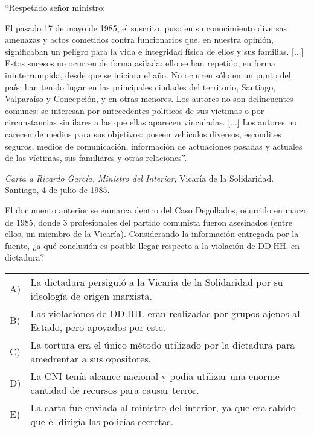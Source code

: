 \documentclass[letterpaper,11pt]{article}
\newcommand{\anchopregunta}{0.9\textwidth}
\begin{document}
\begin{enumerate}
\begin{minipage}{\anchopregunta}
\item \begin{flushleft}
    ``Respetado señor ministro:
\end{flushleft}
El pasado 17 de mayo de 1985, el suscrito, puso en su conocimiento diversas amenazas y actos cometidos contra funcionarios que, en nuestra opinión, significaban un peligro para la vida e integridad física de ellos y sus familias. [...] Estos sucesos no ocurren de forma asilada: ello se han repetido, en forma ininterrumpida, desde que se iniciara el año. No ocurren sólo en un punto del país: han tenido lugar en las principales ciudades del territorio, Santiago, Valparaíso y Concepción, y en otras menores. Los autores no son delincuentes comunes: se interesan por antecedentes políticos de sus víctimas o por circunstancias similares a las que ellas aparecen vinculadas. [...] Los autores no carecen de medios para sus objetivos: poseen vehículos diversos, escondites seguros, medios de comunicación, información de actuaciones pasadas y actuales de las víctimas, sus familiares y otras relaciones''.\\
\begin{flushright}
\textit{Carta a Ricardo García, Ministro del Interior}, Vicaría de la Solidaridad. Santiago, 4 de julio de 1985.
\end{flushright}
El documento anterior se enmarca dentro del Caso Degollados, ocurrido en marzo de 1985, donde 3 profesionales del partido comunista fueron asesinados (entre ellos, un miembro de la Vicaría). Considerando la información entregada por la fuente, ¿a qué conclusión es posible llegar respecto a la violación de DD.HH. en dictadura?
\begin{flushleft}\begin{tabular}{@{\hspace{-.001\textwidth}}l@{\hspace{2pt}}p{}}
A)& La dictadura persiguió a la Vicaría de la Solidaridad por su ideología de origen marxista.\\
B)& Las violaciones de DD.HH. eran realizadas por grupos ajenos al Estado, pero apoyados por este.\\
C)& La tortura era el único método utilizado por la dictadura para amedrentar a sus opositores.\\
D)& La CNI tenía alcance nacional y podía utilizar una enorme cantidad de recursos para causar terror.\\
E)& La carta fue enviada al ministro del interior, ya que era sabido que él dirigía las policías secretas.\\ 

\end{tabular}
\end{flushleft}
\end{minipage}
\end{enumerate}
\end{document}
